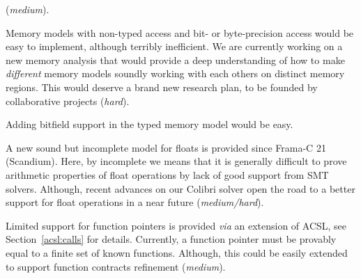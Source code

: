 \begin{description}
(\textit{medium}).
\item[Bytes, unions \& casts.]
Memory models with non-typed access and bit- or byte-precision access would
be easy to implement, although terribly inefficient. We are currently working on a new memory analysis that would provide a deep understanding of how to make \emph{different} memory models soundly working with each others on distinct memory regions. This would deserve a brand new research plan, to be founded by collaborative projects (\textit{hard}).
\item[Bitfields.]
Adding bitfield support in the typed memory model would be easy.
\item[Floats.]
A new sound but incomplete model for floats is provided since \textsf{Frama-C 21} (Scandium). Here, by incomplete we means that it is generally difficult
to prove arithmetic properties of float operations by lack of good support from \textsf{SMT} solvers. Although, recent advances on our \textsf{Colibri} solver open the road to a better support for float operations in a near future (\textit{medium/hard}).
\item[Function pointers.]
Limited support for function pointers is provided \emph{via} an extension of \textsf{ACSL}, see Section~\ref{acsl:calls} for details. Currently, a function
pointer must be provably equal to a finite set of known functions. Although,
this could be easily extended to support function contracts refinement (\textit{medium}).
\end{description}

